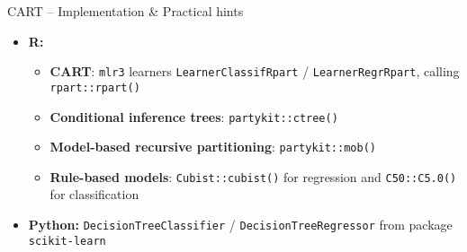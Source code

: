 \begin{frame}{CART -- Implementation \& Practical hints}

\begin{itemize}
  \item \textbf{R:}
  \begin{itemize}
      \item \textbf{CART}: \texttt{mlr3} learners \texttt{LearnerClassifRpart} / 
    \texttt{LearnerRegrRpart}, calling \texttt{rpart::rpart()}
    \item \textbf{Conditional inference trees}: \texttt{partykit::ctree()}
    \item \textbf{Model-based recursive partitioning}: \texttt{partykit::mob()}
    \item \textbf{Rule-based models}: \texttt{Cubist::cubist()} for regression and \texttt{C50::C5.0()} for classification
  \end{itemize}
  \item \textbf{Python:} \texttt{DecisionTreeClassifier} / 
  \texttt{DecisionTreeRegressor} from package \texttt{scikit-learn}
\end{itemize}

\end{frame}

